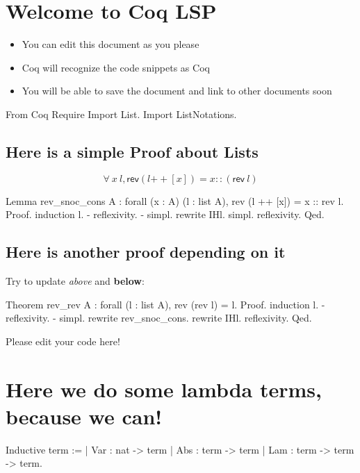 \documentclass{article}
\begin{document}
\section{Welcome to Coq LSP}

\begin{itemize}
\item You can edit this document as you please
\item Coq will recognize the code snippets as Coq
\item You will be able to save the document and link to other documents soon
\end{itemize}

\begin{coq}
From Coq Require Import List.
Import ListNotations.
\end{coq}

\subsection{Here is a simple Proof about Lists}

$$
  \forall~x~l,
    \mathsf{rev}(l \mathrel{++} [x]) = x \mathrel{::} (\mathsf{rev}~l)
$$

\begin{coq}
Lemma rev_snoc_cons A :
  forall (x : A) (l : list A), rev (l ++ [x]) = x :: rev l.
Proof.
  induction l.
  - reflexivity.
  - simpl. rewrite IHl. simpl. reflexivity.
Qed.
\end{coq}

\subsection{Here is another proof depending on it}

Try to update \emph{above} and \textbf{below}:

\begin{coq}
Theorem rev_rev A : forall (l : list A), rev (rev l) = l.
Proof.
  induction l.
  - reflexivity.
  - simpl. rewrite rev_snoc_cons. rewrite IHl.
    reflexivity.
Qed.
\end{coq}

Please edit your code here!

\section{Here we do some lambda terms, because we can!}

\begin{coq}
Inductive term :=
  | Var : nat -> term
  | Abs : term -> term
  | Lam : term -> term -> term.
\end{coq}
\end{document}

